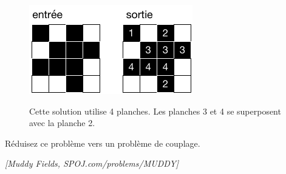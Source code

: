 \documentclass[12pt]{article}
\newcommand{\source}[1]{\begin{flushright}\emph{[#1]}\end{flushright}}
\begin{document}
\begin{figure}[h]
	\centerline{\includegraphics{boue.pdf}}
	Cette solution utilise 4 planches. Les planches 3 et 4 se superposent avec la planche 2.
\end{figure}

Réduisez ce problème vers un problème de couplage.




\source{Muddy Fields, SPOJ.com/problems/MUDDY}
\end{document}
